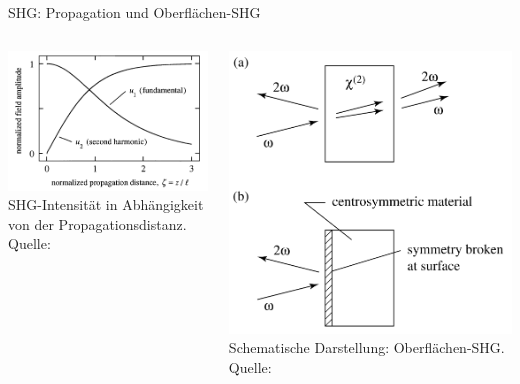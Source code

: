 \documentclass[notes=only]{beamer}
\newcommand{\figcite}[1]{\\[-3mm]{\tiny Quelle: \cite{#1}}}
\begin{document}
\begin{frame}{SHG: Propagation und Oberflächen-SHG}
  \begin{columns}[T,onlytextwidth]
      \centering
      \includegraphics[height=0.28\textheight]{Images/propagation distance.png}\\
      {\tiny SHG-Intensität in Abhängigkeit von der Propagationsdistanz. \figcite{Boyd2020}}
      \vspace{0.4cm}

      \includegraphics[height=0.46\textheight]{Images/surface-shg.png}\\
      {\tiny Schematische Darstellung: Oberflächen-SHG. \figcite{Boyd2020}}


\end{columns}
\end{frame}
\end{document}
